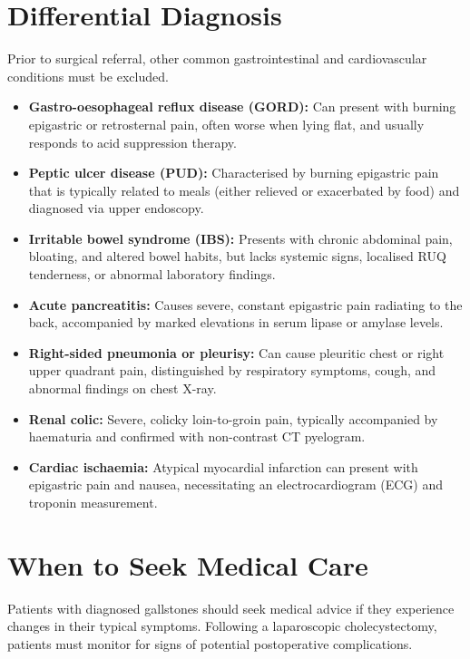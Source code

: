 \section*{Differential Diagnosis}
Prior to surgical referral, other common gastrointestinal and cardiovascular conditions must be excluded.
\begin{itemize}
    \item \textbf{Gastro-oesophageal reflux disease (GORD):} Can present with burning epigastric or retrosternal pain, often worse when lying flat, and usually responds to acid suppression therapy.
    \item \textbf{Peptic ulcer disease (PUD):} Characterised by burning epigastric pain that is typically related to meals (either relieved or exacerbated by food) and diagnosed via upper endoscopy.
    \item \textbf{Irritable bowel syndrome (IBS):} Presents with chronic abdominal pain, bloating, and altered bowel habits, but lacks systemic signs, localised RUQ tenderness, or abnormal laboratory findings.
    \item \textbf{Acute pancreatitis:} Causes severe, constant epigastric pain radiating to the back, accompanied by marked elevations in serum lipase or amylase levels.
    \item \textbf{Right-sided pneumonia or pleurisy:} Can cause pleuritic chest or right upper quadrant pain, distinguished by respiratory symptoms, cough, and abnormal findings on chest X-ray.
    \item \textbf{Renal colic:} Severe, colicky loin-to-groin pain, typically accompanied by haematuria and confirmed with non-contrast CT pyelogram.
    \item \textbf{Cardiac ischaemia:} Atypical myocardial infarction can present with epigastric pain and nausea, necessitating an electrocardiogram (ECG) and troponin measurement.
\end{itemize}

\section*{When to Seek Medical Care}
Patients with diagnosed gallstones should seek medical advice if they experience changes in their typical symptoms. Following a laparoscopic cholecystectomy, patients must monitor for signs of potential postoperative complications.

